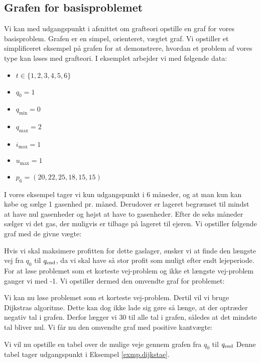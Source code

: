 \subsection{Grafen for basisproblemet} \label{kap:graf_basis}
Vi kan med udgangspunkt i afsnittet om grafteori opstille en graf for vores basisproblem. Grafen er en simpel, orienteret, vægtet graf. Vi opstiller et simplificeret eksempel på grafen for at demonstrere, hvordan et problem af vores type kan løses med grafteori. I eksemplet arbejder vi med følgende data:
\begin{itemize}
  \item $t \in \{1,2,3,4,5,6\}$
  \item $q_{0}=1$
  \item $q_{\min}=0$
  \item $q_{\max}=2$
  \item $i_{\max}=1$
  \item $u_{\max}=1$
  \item $p_{6}=(20,22,25,18,15,15)$
\end{itemize}

I vores eksempel tager vi kun udgangspunkt i 6 måneder, og at man kun kan købe og sælge 1 gasenhed pr. måned. Derudover er lageret begrænset til mindst at have nul gasenheder og højst at have to gasenheder. Efter de seks måneder sælger vi det gas, der muligvis er tilbage på lageret til ejeren. Vi opstiller følgende graf med de givne vægte:



Hvis vi skal maksimere profitten for dette gaslager, ønsker vi at finde den længste vej fra $q_{0}$ til $q_{\textrm{end}}$, da vi skal have så stor profit som muligt efter endt lejeperiode. For at løse problemet som et korteste vej-problem og ikke et længste vej-problem ganger vi med -1. Vi opstiller dermed den omvendte graf for problemet:



Vi kan nu løse problemet som et korteste vej-problem. Dertil vil vi bruge Dijkstras algoritme. Dette kan dog ikke lade sig gøre så længe, at der optræder negativ tal i grafen. Derfor lægger vi 30 til alle tal i grafen, således at det mindste tal bliver nul. Vi får nu den omvendte graf med positive kantvægte:




Vi vil nu opstille en tabel over de mulige veje gennem grafen fra $q_0$ til $q_{\textrm{end}}$ Denne tabel tager udgangspunkt i Eksempel \ref{exmp.dijkstae}.

